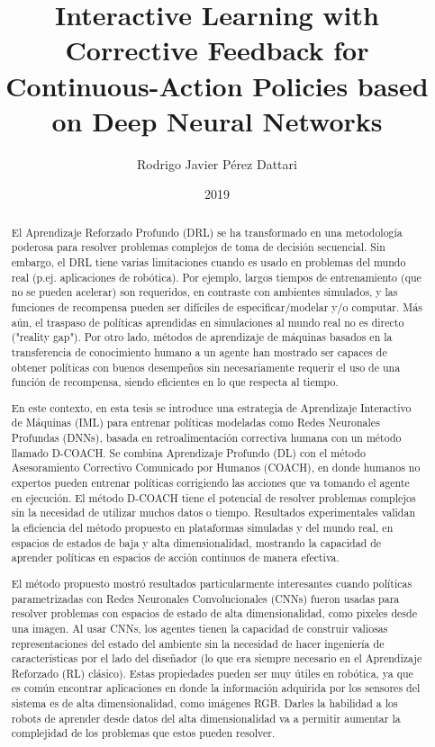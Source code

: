 \documentclass[upright, contnum]{umemoria}
\author{Rodrigo Javier Pérez Dattari}
\title{Interactive Learning with Corrective Feedback for Continuous-Action Policies based on Deep Neural Networks}
\date{2019}
\begin{document}
\frontmatter
\maketitle

\begin{abstract}
El Aprendizaje Reforzado Profundo (DRL) se ha transformado en una metodología poderosa para resolver problemas complejos de toma de decisión secuencial. Sin embargo, el DRL tiene varias limitaciones cuando es usado en problemas del mundo real (p.ej. aplicaciones de robótica). Por ejemplo, largos tiempos de entrenamiento (que no se pueden acelerar) son requeridos, en contraste con ambientes simulados, y las funciones de recompensa pueden ser difíciles de especificar/modelar y/o computar. Más aún, el traspaso de políticas aprendidas en simulaciones al mundo real no es directo ("reality gap"). Por otro lado, métodos de aprendizaje de máquinas basados en la transferencia de conocimiento humano a un agente han mostrado ser capaces de obtener políticas con buenos desempeños sin necesariamente requerir el uso de una función de recompensa, siendo eficientes en lo que respecta al tiempo.

En este contexto, en esta tesis se introduce una estrategia de Aprendizaje Interactivo de Máquinas (IML) para entrenar políticas modeladas como Redes Neuronales Profundas (DNNs), basada en retroalimentación correctiva humana con un método llamado D-COACH. Se combina Aprendizaje Profundo (DL) con el método Asesoramiento Correctivo Comunicado por Humanos (COACH), en donde humanos no expertos pueden entrenar políticas corrigiendo las acciones que va tomando el agente en ejecución. El método D-COACH tiene el potencial de resolver problemas complejos sin la necesidad de utilizar muchos datos o tiempo. Resultados experimentales validan la eficiencia del método propuesto en plataformas simuladas y del mundo real, en espacios de estados de baja y alta dimensionalidad, mostrando la capacidad de aprender políticas en espacios de acción continuos de manera efectiva.

El método propuesto mostró resultados particularmente interesantes cuando políticas parametrizadas con Redes Neuronales Convolucionales (CNNs) fueron usadas para resolver problemas con espacios de estado de alta dimensionalidad, como pixeles desde una imagen. Al usar CNNs, los agentes tienen la capacidad de construir valiosas representaciones del estado del ambiente sin la necesidad de hacer ingeniería de características por el lado del diseñador (lo que era siempre necesario en el Aprendizaje Reforzado (RL) clásico). Estas propiedades pueden ser muy útiles en robótica, ya que es común encontrar aplicaciones en donde la información adquirida por los sensores del sistema es de alta dimensionalidad, como imágenes RGB. Darles la habilidad a los robots de aprender desde datos del alta dimensionalidad va a permitir aumentar la complejidad de los problemas que estos pueden resolver.


\end{abstract}
\end{document}
